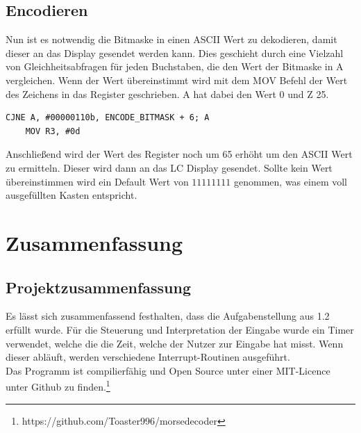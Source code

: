 \documentclass[a4paper,12pt]{article}
\begin{document}
	\subsection{Encodieren}
	Nun ist es notwendig die Bitmaske in einen ASCII Wert zu dekodieren, damit dieser an das Display gesendet werden kann. Dies geschieht durch eine Vielzahl von Gleichheitsabfragen für jeden Buchstaben, die den Wert der Bitmaske in A vergleichen. Wenn der Wert übereinstimmt wird mit dem MOV Befehl der Wert des Zeichens in das Register geschrieben. A hat dabei den Wert 0 und Z 25.
	\begin{lstlisting}[caption={Beispielhafte Gleihheitsabfrage für den Buchstaben A},captionpos=b]
	CJNE A, #00000110b, ENCODE_BITMASK + 6; A
	MOV R3, #0d
	\end{lstlisting}
	Anschließend wird der Wert des Register noch um 65 erhöht um den ASCII Wert zu ermitteln. Dieser wird dann an das LC Display gesendet. Sollte kein Wert übereinstimmen wird ein Default Wert von $11111111$ genommen, was einem voll ausgefüllten Kasten entspricht.


	\newpage
	\section{Zusammenfassung}
	\subsection{Projektzusammenfassung}
	Es lässt sich zusammenfassend festhalten, dass die Aufgabenstellung aus 1.2 erfüllt wurde. Für die Steuerung und Interpretation der Eingabe wurde ein Timer verwendet, welche die die Zeit, welche der Nutzer zur Eingabe hat misst. Wenn dieser abläuft, werden verschiedene Interrupt-Routinen ausgeführt.\\
	Das Programm ist compilierfähig und Open Source unter einer MIT-Licence unter Github zu finden.\footnote{https://github.com/Toaster996/morsedecoder} \\
	
\end{document}
